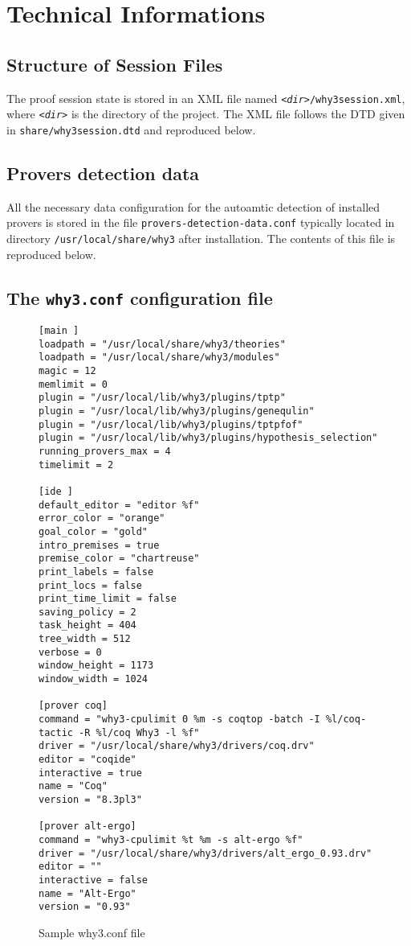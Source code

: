 \chapter{Technical Informations}


\section{Structure of Session Files}

The proof session state is stored in an XML file named
\texttt{\textsl{<dir>}/why3session.xml}, where \texttt{\textsl{<dir>}}
is the directory of the project.
The XML file follows the DTD given in \texttt{share/why3session.dtd} and reproduced below.



\section{Provers detection data}
\label{sec:proverdetecttiondata}

All the necessary data configuration for the autoamtic detection of
installed provers is stored in the file
\texttt{provers-detection-data.conf} typically located in directory
\verb|/usr/local/share/why3| after installation. The contents of this
file is reproduced below.


\section{The \texttt{why3.conf} configuration file}
\label{sec:whyconffile}

\begin{figure}[p]
\begin{verbatim}
[main ]
loadpath = "/usr/local/share/why3/theories"
loadpath = "/usr/local/share/why3/modules"
magic = 12
memlimit = 0
plugin = "/usr/local/lib/why3/plugins/tptp"
plugin = "/usr/local/lib/why3/plugins/genequlin"
plugin = "/usr/local/lib/why3/plugins/tptpfof"
plugin = "/usr/local/lib/why3/plugins/hypothesis_selection"
running_provers_max = 4
timelimit = 2

[ide ]
default_editor = "editor %f"
error_color = "orange"
goal_color = "gold"
intro_premises = true
premise_color = "chartreuse"
print_labels = false
print_locs = false
print_time_limit = false
saving_policy = 2
task_height = 404
tree_width = 512
verbose = 0
window_height = 1173
window_width = 1024

[prover coq]
command = "why3-cpulimit 0 %m -s coqtop -batch -I %l/coq-tactic -R %l/coq Why3 -l %f"
driver = "/usr/local/share/why3/drivers/coq.drv"
editor = "coqide"
interactive = true
name = "Coq"
version = "8.3pl3"

[prover alt-ergo]
command = "why3-cpulimit %t %m -s alt-ergo %f"
driver = "/usr/local/share/why3/drivers/alt_ergo_0.93.drv"
editor = ""
interactive = false
name = "Alt-Ergo"
version = "0.93"
\end{verbatim}
  \caption{Sample why3.conf file}
\label{fig:why3conf}
\end{figure}



